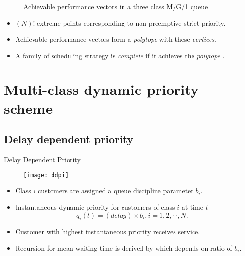 \documentclass[compress, serif, onlymath, professionalfonts]{beamer}
\begin{document}
\begin{frame}
\begin{figure}[ht]
\begin{minipage}[htb]{0.4\linewidth}
\resizebox{0.9 \textwidth}{!}{}
\end{minipage}
\begin{minipage}[htb]{0.4\linewidth}
\centering
\resizebox{1.1 \textwidth}{!}{}
\end{minipage}
\caption{ Achievable performance vectors in a three class M/G/1 queue \citep{mitranibook}}
\end{figure}
\vspace{-.6cm}
\begin{itemize}
\item $(N)!$ extreme points corresponding to non-preemptive strict priority. 
\item  Achievable performance vectors form a \textit{polytope} with these \textit{vertices}.
\item A family of scheduling strategy is \textit{complete} if it achieves the \textit{polytope} \citep{complete}.%
\end{itemize}
\end{frame}
\section{Multi-class dynamic priority scheme}
\subsection{Delay dependent priority}
\begin{frame}{Delay Dependent Priority \citep{Kleinrock_ddp}}
\begin{figure}[htb!]
\centering
\texttt{[image: ddpi]}
\vspace{-.85cm}
\label{basicmodel}
\end{figure}
\begin{itemize}
\item Class $i$ customers are assigned a queue discipline parameter $b_i$.
\item Instantaneous dynamic priority for customers of class $i$ at time $t$
$$q_i(t) = (delay)\times b_i, i = 1,2, \cdots, N.$$
\item Customer with highest instantaneous priority receives service.
\item Recursion for mean waiting time is derived by \citet{Kleinrock_ddp} which depends on ratio of $b_i$.
\end{itemize}
\end{frame}
\end{document}

